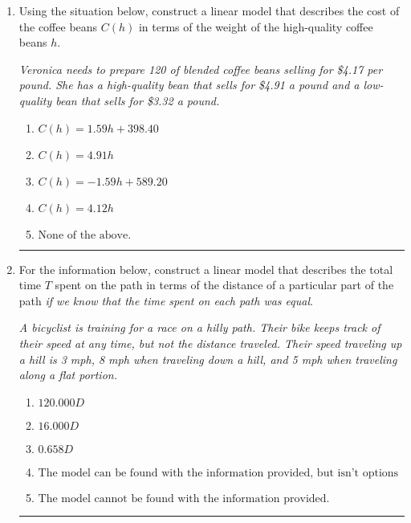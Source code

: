\documentclass[14pt]{extbook}
\newcommand{\litem}[1]{\item#1\hspace*{-1cm}\rule{\textwidth}{0.4pt}}
\begin{document}
\begin{enumerate}
\litem{
Using the situation below, construct a linear model that describes the cost of the coffee beans $C(h)$ in terms of the weight of the high-quality coffee beans $h$.
\begin{center}
    \textit{ Veronica needs to prepare 120 of blended coffee beans selling for \$4.17 per pound. She has a high-quality bean that sells for \$4.91 a pound and a low-quality bean that sells for \$3.32 a pound. }
\end{center}
\begin{enumerate}[label=\Alph*.]
\item \( C(h) = 1.59 h + 398.40 \)
\item \( C(h) = 4.91 h \)
\item \( C(h) = -1.59 h + 589.20 \)
\item \( C(h) = 4.12 h \)
\item \( \text{None of the above.} \)

\end{enumerate} }
\litem{
For the information below, construct a linear model that describes the total time $T$ spent on the path in terms of the distance of a particular part of the path \textit{if we know that the time spent on each path was equal}.
\begin{center}
    \textit{ A bicyclist is training for a race on a hilly path. Their bike keeps track of their speed at any time, but not the distance traveled. Their speed traveling up a hill is 3 mph, 8 mph when traveling down a hill, and 5 mph when traveling along a flat portion. }
\end{center}
\begin{enumerate}[label=\Alph*.]
\item \( 120.000 D \)
\item \( 16.000 D \)
\item \( 0.658 D \)
\item \( \text{The model can be found with the information provided, but isn't options 1-3.} \)
\item \( \text{The model cannot be found with the information provided.} \)


\end{enumerate}}
\end{enumerate}
\end{document}
